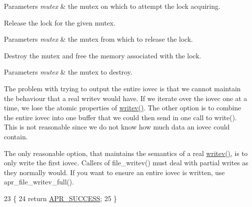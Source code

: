 \begin{DoxyParams}{Parameters}
{\em mutex} & the mutex on which to attempt the lock acquiring.\\
\hline
\end{DoxyParams}
Release the lock for the given mutex. 
\begin{DoxyParams}{Parameters}
{\em mutex} & the mutex from which to release the lock.\\
\hline
\end{DoxyParams}
Destroy the mutex and free the memory associated with the lock. 
\begin{DoxyParams}{Parameters}
{\em mutex} & the mutex to destroy. \\
\hline
\end{DoxyParams}
The problem with trying to output the entire iovec is that we cannot maintain the behaviour that a real writev would have. If we iterate over the iovec one at a time, we lose the atomic properties of \hyperlink{apr__arch__os2calls_8h_a3d0f3996136a9b5ab46431c60c746efd}{writev()}. The other option is to combine the entire iovec into one buffer that we could then send in one call to write(). This is not reasonable since we do not know how much data an iovec could contain.

The only reasonable option, that maintains the semantics of a real \hyperlink{apr__arch__os2calls_8h_a3d0f3996136a9b5ab46431c60c746efd}{writev()}, is to only write the first iovec. Callers of file\+\_\+writev() must deal with partial writes as they normally would. If you want to ensure an entire iovec is written, use apr\+\_\+file\+\_\+writev\+\_\+full().
\begin{DoxyCode}
23 \{
24     \textcolor{keywordflow}{return} \hyperlink{group__apr__errno_ga9ee311b7bf1c691dc521d721339ee2a6}{APR\_SUCCESS};
25 \}
\end{DoxyCode}
